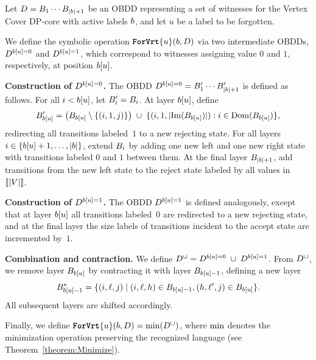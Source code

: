Let $D = B_1 \cdots B_{|b|+1}$ be an OBDD representing a set of
witnesses for the {\sc Vertex Cover} DP-core with active labels
$b$, and let $u$ be a label to be forgotten.

We define the symbolic operation $\texttt{\textbf{ForVrt}}\{u\}(b,D)$ via
two intermediate OBDDs,
$D^{b[u]=0}$ and $D^{b[u]=1}$, which correspond to
witnesses assigning value $0$ and $1$, respectively, at position
$b[u]$.

\medskip
\noindent\textbf{Construction of $D^{b[u]=0}$.}
The OBDD $D^{b[u]=0} = B'_1 \cdots B'_{|b|+1}$ is
defined as follows.
For all $i < b[u]$, let $B'_i = B_i$.
At layer $b[u]$, define
\[
B'_{b[u]}
=
\bigl(B_{b[u]} \setminus
\{(i,1,j)\}\bigr)
\;\cup\;
\{(i,1,|\mathrm{Im}(B_{b[u]})|) : i \in \mathrm{Dom}(B_{b[u]})\},
\]
redirecting all transitions labeled~$1$ to a new rejecting state.
For all layers $i \in \{b[u]+1,\dots,|b|\}$, extend
$B_i$ by adding one new left and one new right state with transitions labeled
$0$ and $1$ between them.
At the final layer $B_{|b|+1}$, add transitions from the new left
state to the reject state labeled by all values in $\llbracket |V| \rrbracket$.

\medskip
\noindent\textbf{Construction of $D^{b[u]=1}$.}
The OBDD $D^{b[u]=1}$ is defined analogously, except that at layer
$b[u]$ all transitions labeled~$0$ are redirected to a new rejecting
state, and at the final layer the size labels of transitions incident to the
accept state are incremented by~$1$.

\medskip
\noindent\textbf{Combination and contraction.}
We define
$D^\cup = D^{b[u]=0} \;\cup\; D^{b[u]=1}$.
From $D^\cup$, we remove layer $B_{b[u]}$ by contracting it with
layer $B_{b[u]-1}$, defining a new layer
\[
B^*_{b[u]-1}
=
\{(i,\ell,j) \mid
(i,\ell,h) \in B_{b[u]-1},
(h,\ell',j) \in B_{b[u]}\}.
\]
All subsequent layers are shifted accordingly.

Finally, we define
$\texttt{\textbf{ForVrt}}\{u\}(b,D)
=
\mathrm{min}(D^\cup)$,
where $\mathrm{min}$ denotes the minimization operation preserving the recognized
language (see Theorem~\ref{theorem:Minimize}).




